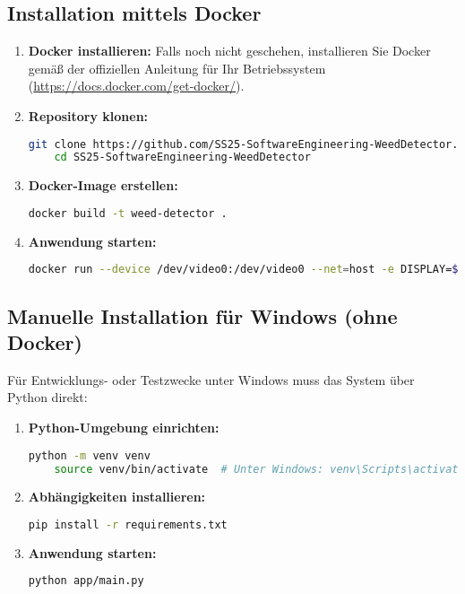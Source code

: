 \documentclass[12pt, a4paper]{scrreprt}
\begin{document}
\subsection{Installation mittels Docker}
\begin{enumerate}
    \item \textbf{Docker installieren:} Falls noch nicht geschehen, installieren Sie Docker gemäß der offiziellen Anleitung für Ihr Betriebssystem (\url{https://docs.docker.com/get-docker/}).
    
    \item \textbf{Repository klonen:}
    \begin{lstlisting}[language=bash]
    git clone https://github.com/SS25-SoftwareEngineering-WeedDetector.git
    cd SS25-SoftwareEngineering-WeedDetector
    \end{lstlisting}
    
    \item \textbf{Docker-Image erstellen:}
    \begin{lstlisting}[language=bash]
    docker build -t weed-detector .
    \end{lstlisting}
    
    \item \textbf{Anwendung starten:}
    \begin{lstlisting}[language=bash]
    docker run --device /dev/video0:/dev/video0 --net=host -e DISPLAY=$DISPLAY -v /tmp/.X11-unix:/tmp/.X11-unix weed-detector
    \end{lstlisting}
\end{enumerate}

\subsection{Manuelle Installation für Windows (ohne Docker)}
Für Entwicklungs- oder Testzwecke unter Windows muss das System über Python direkt:

\begin{enumerate}
    \item \textbf{Python-Umgebung einrichten:}
    \begin{lstlisting}[language=bash]
    python -m venv venv
    source venv/bin/activate  # Unter Windows: venv\Scripts\activate
    \end{lstlisting}
    
    \item \textbf{Abhängigkeiten installieren:}
    \begin{lstlisting}[language=bash]
    pip install -r requirements.txt
    \end{lstlisting}
    
    \item \textbf{Anwendung starten:}
    \begin{lstlisting}[language=bash]
    python app/main.py
    \end{lstlisting}
\end{enumerate}
\end{document}
